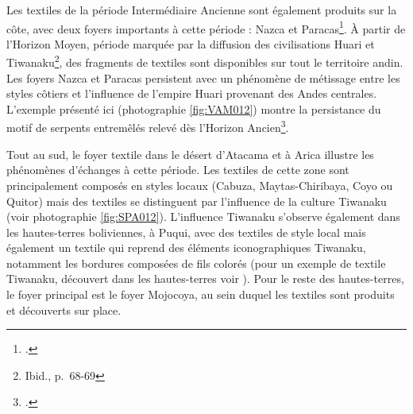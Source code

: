 \noindent Les textiles de la période Intermédiaire Ancienne sont également produits sur la côte, avec deux foyers importants à cette période : Nazca et Paracas\footcite[p.~58-59]{boissiereAtlasAmeriquePrecolombienne2022}.
À partir de l'Horizon Moyen, période marquée par la diffusion des civilisations Huari et Tiwanaku\footnote{Ibid., p.~68-69}, des fragments de textiles sont disponibles sur tout le territoire andin. Les foyers Nazca et Paracas persistent avec un phénomène de métissage entre les styles côtiers et l'influence de l'empire Huari provenant des Andes centrales. L'exemple présenté ici (photographie \ref{fig:VAM012}) montre la persistance du motif de serpents entremêlés relevé dès l'Horizon Ancien\footcite[p.~1]{desrosiersRevisitingOcucajeOpened2008}.

\noindent Tout au sud, le foyer textile dans le désert d'Atacama et à Arica illustre les phénomènes d'échanges à cette période. Les textiles de cette zone sont principalement composés en styles locaux (Cabuza, Maytas-Chiribaya, Coyo ou Quitor) mais des textiles se distinguent par l'influence de la culture Tiwanaku (voir photographie \ref{fig:SPA012}). L'influence Tiwanaku s'observe également dans les hautes-terres boliviennes, à Puqui, avec des textiles de style local mais également un textile qui reprend des éléments iconographiques Tiwanaku, notamment les bordures composées de fils colorés (pour un exemple de textile Tiwanaku, découvert dans les hautes-terres voir \pageref{fig:MNA037}). Pour le reste des hautes-terres, le foyer principal est le foyer Mojocoya, au sein duquel les textiles sont produits et découverts sur place.

